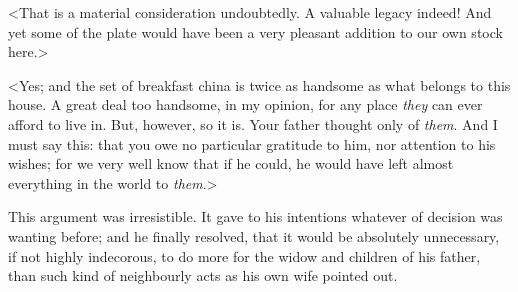 <That is a material consideration undoubtedly. A valuable legacy indeed! And yet some of the plate would have been a very pleasant addition to our own stock here.>

<Yes; and the set of breakfast china is twice as handsome as what belongs to this house. A great deal too handsome, in my opinion, for any place \textit{they} can ever afford to live in. But, however, so it is. Your father thought only of \textit{them}. And I must say this: that you owe no particular gratitude to him, nor attention to his wishes; for we very well know that if he could, he would have left almost everything in the world to \textit{them}.>

This argument was irresistible. It gave to his intentions whatever of decision was wanting before; and he finally resolved, that it would be absolutely unnecessary, if not highly indecorous, to do more for the widow and children of his father, than such kind of neighbourly acts as his own wife pointed out.
